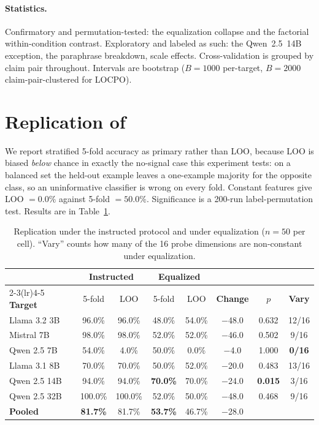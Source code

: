 \paragraph{Statistics.} Confirmatory and permutation-tested: the equalization collapse and the factorial within-condition contrast. Exploratory and labeled as such: the Qwen~2.5~14B exception, the paraphrase breakdown, scale effects. Cross-validation is grouped by claim pair throughout. Intervals are bootstrap ($B\!=\!1000$ per-target, $B\!=\!2000$ claim-pair-clustered for LOCPO).

\section{Replication of \citet{pacchiardi2023catch}}
\label{app:r1}

We report stratified 5-fold accuracy as primary rather than LOO, because LOO is biased \emph{below} chance in exactly the no-signal case this experiment tests: on a balanced set the held-out example leaves a one-example majority for the opposite class, so an uninformative classifier is wrong on every fold. Constant features give LOO $=0.0\%$ against 5-fold $=50.0\%$. Significance is a 200-run label-permutation test. Results are in Table~\ref{tab:r1}.

\begin{table}[h]
\centering
\small
\setlength{\tabcolsep}{4pt}
\caption{Replication under the instructed protocol and under equalization ($n\!=\!50$ per cell). ``Vary'' counts how many of the 16 probe dimensions are non-constant under equalization.}
\label{tab:r1}
\begin{tabular}{lccccccc}
\toprule
& \multicolumn{2}{c}{\textbf{Instructed}} & \multicolumn{2}{c}{\textbf{Equalized}} & & & \\
\cmidrule(lr){2-3}\cmidrule(lr){4-5}
\textbf{Target} & 5-fold & LOO & 5-fold & LOO & \textbf{Change} & $p$ & \textbf{Vary} \\
\midrule
Llama 3.2 3B  & \phantom{0}96.0\% & 96.0\% & 48.0\% & 54.0\% & $-$48.0 & 0.632 & 12/16 \\
Mistral 7B    & \phantom{0}98.0\% & 98.0\% & 52.0\% & 52.0\% & $-$46.0 & 0.502 & \phantom{0}9/16 \\
Qwen 2.5 7B   & \phantom{0}54.0\% & \phantom{0}4.0\% & 50.0\% & \phantom{0}0.0\% & $-$4.0\phantom{0} & 1.000 & \textbf{0/16} \\
Llama 3.1 8B  & \phantom{0}70.0\% & 70.0\% & 50.0\% & 52.0\% & $-$20.0 & 0.483 & 13/16 \\
Qwen 2.5 14B  & \phantom{0}94.0\% & 94.0\% & \textbf{70.0\%} & 70.0\% & $-$24.0 & \textbf{0.015} & \phantom{0}3/16 \\
Qwen 2.5 32B  & 100.0\% & 100.0\% & 52.0\% & 50.0\% & $-$48.0 & 0.468 & \phantom{0}9/16 \\
\midrule
\textbf{Pooled} & \textbf{81.7\%} & 81.7\% & \textbf{53.7\%} & 46.7\% & $-$28.0 & & \\
\bottomrule
\end{tabular}
\end{table}

